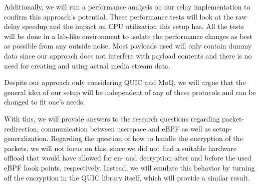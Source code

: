 Additionally, we will run a performance analysis on our relay implementation to confirm this approach's potential.
These performance tests will look at the raw delay speedup and the impact on CPU utilization this setup has.
All the tests will be done in a lab-like environment to isolate the performance changes as best as possible
from any outside noise.
Most payloads used will only contain dummy data since our approach does not interfere with payload contents 
and there is no need for creating and using actual media stream data.

Despite our approach only considering QUIC and MoQ, we will argue that the general idea of our setup will be independent of
any of these protocols and can be changed to fit one's needs.

With this, we will provide answers to the research questions regarding packet-redirection, communication between userspace and eBPF
as well as setup-generalization.
Regarding the question of how to handle the encryption of the packets, we will not focus on this, since we did not find a suitable hardware offload that would have allowed for en- and decryption after and before the used eBPF hook points, respectively.
Instead, we will emulate this behavior by turning off the encryption in the QUIC library itself, which will provide a similar result.

